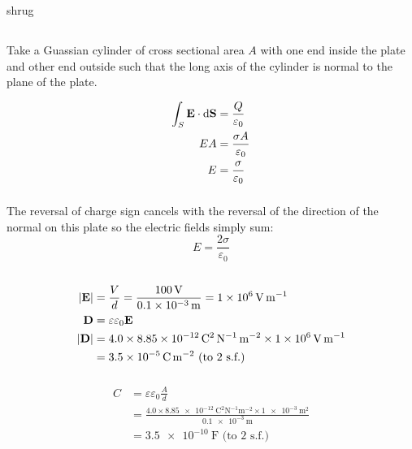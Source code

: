 shrug
\subsection{}
\subsubsection{}
Take a Guassian cylinder of cross sectional area $ A $ with one end inside the plate and other end outside such that the long axis of the cylinder is normal to the plane of the plate.

\begin{align*}
    \int_S \mathbf{E} \cdot \dif \mathbf{S} & = \frac{Q}{\varepsilon_0}\\
    EA & = \frac{\sigma A}{\varepsilon_0}\\
    E & = \frac{\sigma}{\varepsilon_0}
\end{align*}

\subsubsection{}
The reversal of charge sign cancels with the reversal of the direction of the normal on this plate so the electric fields simply sum:
\begin{equation*}
    E = \frac{2 \sigma}{\varepsilon_0}
\end{equation*}

\subsection{}
\subsubsection{}
\begin{align*}
    \abs{\mathbf{E}} & = \frac{V}{d} = \frac{\SI{100}{\volt}}{\SI{0.1e-3}{\metre}} = \SI{1e6}{\volt\metre\tothe{-1}}\\
    \mathbf{D} & = \varepsilon \varepsilon_0 \mathbf{E}\\
    \abs{\mathbf{D}} & = 4.0 \times \SI{8.85e-12}{\coulomb\tothe{2}\newton\tothe{-1}\metre\tothe{-2}} \times \SI{1e6}{\volt\metre\tothe{-1}}\\
    & = \SI{3.5e-5}{\coulomb\metre\tothe{-2}} \textrm{ (to 2 s.f.)}
\end{align*}

\subsubsection{}
\begin{align*}
    C & = \varepsilon \varepsilon_0 \frac{A}{d}\\
    & = \frac{4.0 \times \SI{8.85e-12}{\coulomb\tothe{2}\newton\tothe{-1}\metre\tothe{-2}} \times \SI{1e-3}{\metre\tothe{2}}}{\SI{0.1e-3}{\metre}}\\
    & = \SI{3.5e-10}{\farad} \textrm{ (to 2 s.f.)}
\end{align*}

